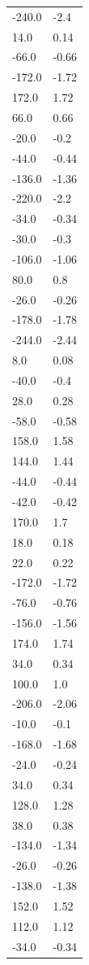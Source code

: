 \begin{longtable}{ll}
-240.0 & -2.4 \\
14.0 & 0.14 \\
-66.0 & -0.66 \\
-172.0 & -1.72 \\
172.0 & 1.72 \\
66.0 & 0.66 \\
-20.0 & -0.2 \\
-44.0 & -0.44 \\
-136.0 & -1.36 \\
-220.0 & -2.2 \\
-34.0 & -0.34 \\
-30.0 & -0.3 \\
-106.0 & -1.06 \\
80.0 & 0.8 \\
-26.0 & -0.26 \\
-178.0 & -1.78 \\
-244.0 & -2.44 \\
8.0 & 0.08 \\
-40.0 & -0.4 \\
28.0 & 0.28 \\
-58.0 & -0.58 \\
158.0 & 1.58 \\
144.0 & 1.44 \\
-44.0 & -0.44 \\
-42.0 & -0.42 \\
170.0 & 1.7 \\
18.0 & 0.18 \\
22.0 & 0.22 \\
-172.0 & -1.72 \\
-76.0 & -0.76 \\
-156.0 & -1.56 \\
174.0 & 1.74 \\
34.0 & 0.34 \\
100.0 & 1.0 \\
-206.0 & -2.06 \\
-10.0 & -0.1 \\
-168.0 & -1.68 \\
-24.0 & -0.24 \\
34.0 & 0.34 \\
128.0 & 1.28 \\
38.0 & 0.38 \\
-134.0 & -1.34 \\
-26.0 & -0.26 \\
-138.0 & -1.38 \\
152.0 & 1.52 \\
112.0 & 1.12 \\
-34.0 & -0.34 \\

\end{longtable}
